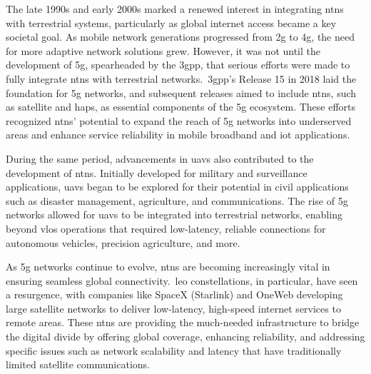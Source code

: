The late 1990s and early 2000s marked a renewed interest in integrating \glspl{ntn} with terrestrial systems, particularly as global internet access became a key societal goal. As mobile network generations progressed from \gls{2g} to \gls{4g}, the need for more adaptive network solutions grew. However, it was not until the development of \gls{5g}, spearheaded by the \gls{3gpp}, that serious efforts were made to fully integrate \glspl{ntn} with terrestrial networks.\ \gls{3gpp}'s Release 15 \autocite{3gpp_rel15} in 2018 laid the foundation for \gls{5g} networks, and subsequent releases aimed to include \glspl{ntn}, such as satellite and \glspl{hap}, as essential components of the \gls{5g} ecosystem. These efforts recognized \glspl{ntn}' potential to expand the reach of \gls{5g} networks into underserved areas and enhance service reliability in mobile broadband and \gls{iot} applications.

During the same period, advancements in \glspl{uav} also contributed to the development of \glspl{ntn}. Initially developed for military and surveillance applications, \glspl{uav} began to be explored for their potential in civil applications such as disaster management, agriculture, and communications. The rise of \gls{5g} networks allowed for \glspl{uav} to be integrated into terrestrial networks, enabling beyond \gls{vlos} operations that required low-latency, reliable connections for autonomous vehicles, precision agriculture, and more.

As \gls{5g} networks continue to evolve, \glspl{ntn} are becoming increasingly vital in ensuring seamless global connectivity.\ \gls{leo} constellations, in particular, have seen a resurgence, with companies like SpaceX (Starlink) \autocite{tao2022impact} and OneWeb \autocite{zhu2022laser} developing large satellite networks to deliver low-latency, high-speed internet services to remote areas. These \glspl{ntn} are providing the much-needed infrastructure to bridge the digital divide by offering global coverage, enhancing reliability, and addressing specific issues such as network scalability and latency that have traditionally limited satellite communications.


